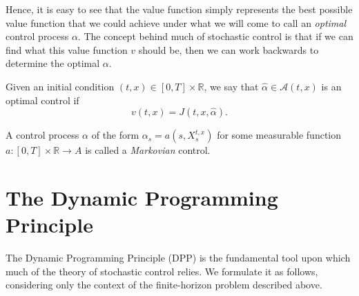 Hence, it is easy to see that the value function simply represents the best possible 
value function that we could achieve under what we will come to call an \emph{optimal}
control process $\alpha$. The concept behind much of stochastic control is that if 
we can find what this value function $v$ should be, then we can work backwards to determine 
the optimal $\alpha$.

\begin{definition}
    Given an initial condition $(t,x)\in[0,T]\times\mathbb{R}$, we say that $\hat{\alpha}\in\mathcal{A}(t,x)$
    is an optimal control if
    \begin{equation*}
        v(t,x)=J(t,x,\hat{\alpha}).
    \end{equation*}
\end{definition}

\begin{remark}
    A control process $\alpha$ of the form $\alpha_s=a(s,X_s^{t,x})$ for some measurable
    function $a:[0,T]\times\mathbb{R}\rightarrow A$ is called a \emph{Markovian} control.
\end{remark}

\section{The Dynamic Programming Principle}\label{sec:2.4}

The Dynamic Programming Principle (DPP) is the fundamental tool upon which much of the 
theory of stochastic control relies. We formulate it as follows, considering only
the context of the finite-horizon problem described above.

